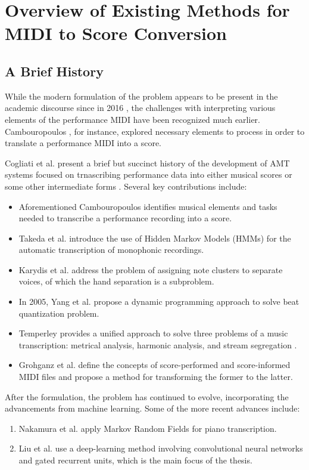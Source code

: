 \chapter{Overview of Existing Methods for MIDI to Score Conversion}\label{overview_of_existing_methods_for_midi_to_score_conversion}

\section{A Brief History}

While the modern formulation of the problem appears to be present in the academic discourse since in 2016 \cite{Cogliati2016}, the challenges with interpreting various elements of the performance MIDI have been recognized much earlier. Cambouropoulos \cite{Cambouropoulos2000}, for instance, explored necessary elements to process in order to translate a performance MIDI into a score.

Cogliati et al. present a brief but succinct history of the development of AMT systems focused on trnascribing performance data into either musical scores or some other intermediate forms \cite{Cogliati2016}. Several key contributions include:
\begin{itemize}
	\item Aforementioned Cambouropoulos \cite{Cambouropoulos2000} identifies musical elements and tasks needed to transcribe a performance recording into a score.
	\item Takeda et al. \cite{Takeda2002} introduce the use of Hidden Markov Models (HMMs) for the automatic transcription of monophonic recordings.
	\item Karydis et al. \cite{Karydis2007} address the problem of assigning note clusters to separate voices, of which the hand separation is a subproblem.
	\item In 2005, Yang et al. \cite{Yang2005} propose a dynamic programming approach to solve beat quantization problem.
	\item Temperley provides a unified approach to solve three problems of a music transcription: metrical analysis, harmonic analysis, and stream segregation \cite{Temperley2009}.
	\item Grohganz et al. \cite{Grohganz2014} define the concepts of score-performed and score-informed MIDI files and propose a method for transforming the former to the latter.
\end{itemize}

After the formulation, the problem has continued to evolve, incorporating the advancements from machine learning. Some of the more recent advances include:
\begin{enumerate}
	\item Nakamura et al. \cite{Nakamura2017a} apply Markov Random Fields for piano transcription.
	\item Liu et al. \cite{Liu2022} use a deep-learning method involving convolutional neural networks and gated recurrent units, which is the main focus of the thesis.
\end{enumerate}

